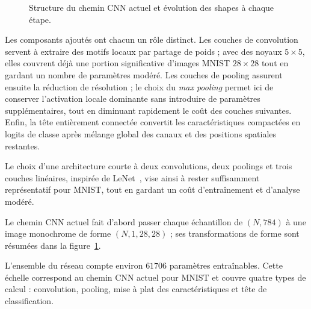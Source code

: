 \documentclass[a4paper,11pt,oneside]{article}
\begin{document}
\begin{figure}[H]
\caption{Structure du chemin CNN actuel et évolution des shapes à chaque étape.}
\label{fig:cnn_architecture_flow}
\end{figure}

Les composants ajoutés ont chacun un rôle distinct. Les couches de convolution servent à extraire des motifs locaux par partage de poids ; avec des noyaux \(5\times5\), elles couvrent déjà une portion significative d'images MNIST \(28\times28\) tout en gardant un nombre de paramètres modéré. Les couches de pooling assurent ensuite la réduction de résolution ; le choix du \emph{max pooling} permet ici de conserver l'activation locale dominante sans introduire de paramètres supplémentaires, tout en diminuant rapidement le coût des couches suivantes. Enfin, la tête entièrement connectée convertit les caractéristiques compactées en logits de classe après mélange global des canaux et des positions spatiales restantes.

Le choix d'une architecture courte à deux convolutions, deux poolings et trois couches linéaires, inspirée de LeNet~\cite{lecun1998}, vise ainsi à rester suffisamment représentatif pour MNIST, tout en gardant un coût d'entraînement et d'analyse modéré.

Le chemin CNN actuel fait d'abord passer chaque échantillon de $(N,784)$ à une image monochrome de forme $(N,1,28,28)$ ; ses transformations de forme sont résumées dans la figure~\ref{fig:cnn_architecture_flow}.

L'ensemble du réseau compte environ $61706$ paramètres entraînables. Cette échelle correspond au chemin CNN actuel pour MNIST et couvre quatre types de calcul : convolution, pooling, mise à plat des caractéristiques et tête de classification.
\end{document}
